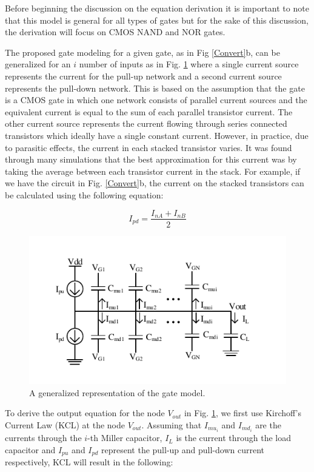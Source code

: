 Before beginning the discussion on the equation derivation it is important to note that this model is general for all types of gates but for the sake of this discussion, the derivation will focus on CMOS NAND and NOR gates.  

The proposed gate modeling for a given gate, as in Fig \ref{Convert}b, can be generalized for an $i$ number of inputs as in Fig. \ref{Gmod} where a single current source represents the current for the pull-up network and a second current source represents the pull-down network. This is based on the assumption that the gate is a CMOS gate in which one network consists of parallel current sources and the equivalent current is equal to the sum of each parallel transistor current. The other current source represents the current flowing through series connected transistors which ideally have a single constant current. However, in practice, due to parasitic effects, the current in each stacked transistor varies. It was found through many simulations that the best approximation for this current was by taking the average between each transistor current in the stack. For example, if we have the circuit in Fig. \ref{Convert}b, the current on the stacked transistors can be calculated using the following equation:

\begin{equation}\label{pdeq}
I_{pd} = \frac{I_{nA}+I_{nB}}{2}
\end{equation}

\begin{figure}[!htbp]
	\centering
	\includegraphics[width=0.75\linewidth]{Figures/GenModel}
	\caption{A generalized representation of the gate model.}
	\label{Gmod}
\end{figure}

To derive the output equation for the node $V_{out}$ in Fig. \ref{Gmod}, we first use Kirchoff’s Current Law (KCL) at the node $V_{out}$. Assuming that $I_{mu_i}$ and $I_{md_i}$ are the currents through the $i$-th Miller capacitor, $I_L$ is the current through the load capacitor and $I_{pu}$ and $I_{pd}$ represent the pull-up and pull-down current respectively, KCL will result in the following:

